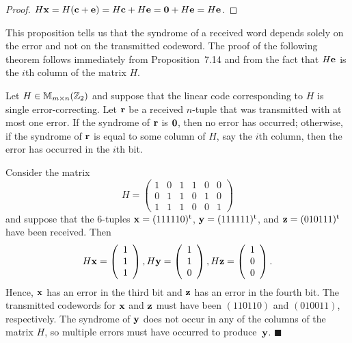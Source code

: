  
\begin{proof}
$H{\bold x} = H({\bold c} +{\bold e}) = H{\bold c} + H{\bold e} =
{\bold 0} + H{\bold e} = H{\bold e}$.  
\end{proof}
 
 
\vspace{2ex}
 
 
This proposition tells us that the syndrome of a received word depends
solely on the error and not on the transmitted codeword. The proof of the
following theorem follows immediately from Proposition~7.14 and from
the fact that $H{\bold e}$ is the $i$th column of the matrix $H$.
 
 
\begin{theorem}
Let $H \in {\Bbb M}_{ m \times n} ( {\Bbb Z}_2)$ and suppose that the
linear code corresponding to $H$ is single error-correcting. Let
${\bold r}$ be a received $n$-tuple that was transmitted with at most
one error. If the syndrome of ${\bold r}$ is ${\bold 0}$, then no
error has occurred; otherwise, if the syndrome of ${\bold r}$ is equal
to some column of $H$, say the $i$th column, then the error has
occurred in the $i$th bit.  
\end{theorem}
 
 
Consider the matrix
\[
H =
\left(
\begin{array}{cccccc}
1 & 0 & 1 & 1 & 0 & 0 \\
0 & 1 & 1 & 0 & 1 & 0 \\
1 & 1 & 1 & 0 & 0 & 1
\end{array}
\right)
\]
and suppose that the  6-tuples ${\bold x} = (111110)^{\rm t}$,
${\bold y} = (111111)^{\rm t}$, and ${\bold z} = (010111)^{\rm t}$
have been received. Then  
\[
H{\bold x} =
\left(
\begin{array}{c} 1 \\ 1 \\ 1 \end{array}
\right),
H{\bold y} =
\left(
\begin{array}{c} 1 \\ 1 \\ 0 \end{array}
\right),
H{\bold z} =
\left(
\begin{array}{c} 1 \\ 0 \\ 0 \end{array}
\right).
\]
Hence, ${\bold x}$ has an error in the third bit and ${\bold z}$ has
an error in the fourth bit. The transmitted codewords for ${\bold x}$
and ${\bold z}$ must have been $(110110)$ and $(010011)$,
respectively. The syndrome of ${\bold y}$ does not occur in any of the
columns of the matrix $H$, so multiple
errors must have occurred to produce~${\bold y}$.
\hspace{\fill} $\blacksquare$
 
